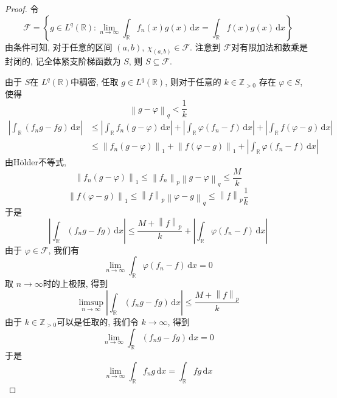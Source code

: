 \documentclass[../main.tex]{subfiles}
\begin{document}
\begin{proof}
 令 \[
    \mathcal{F}= \left\{ g \in L^{q}\left( \mathbb{R}  \right): \lim_{n\to \infty}\int_{\mathbb{R} }f_{n}\left( x \right)g\left( x \right)\,\mathrm{d} x= \int_{\mathbb{R} }f\left( x \right)g\left( x \right)\,\mathrm{d} x      \right\}
    \]
    由条件可知, 对于任意的区间 \(  \left( a,b \right)   \), \(  \chi _{\left( a,b \right) }\in \mathcal{F}  \). 注意到 \(  \mathcal{F}  \)对有限加法和数乘是封闭的, 记全体紧支阶梯函数为 \(  S  \), 则 \(  S\subseteq \mathcal{F}  \).
    
  由于 \(  S  \)在 \(  L^{q}\left( \mathbb{R}  \right)   \)中稠密,  任取 \(  g\in L^{q}\left( \mathbb{R}  \right)   \), 则对于任意的 \(  k\in \mathbb{Z} _{> 0}  \) 存在 \(   \varphi \in S  \), 使得   \[
  \left\| g- \varphi  \right\|_{q}<  \frac{1 }{k } 
  \]\[
\begin{aligned}
  \left| \int_{\mathbb{R} }\left( f_{n}g-fg \right)\,\mathrm{d} x \right|&\le \left| \int_{\mathbb{R} }f_{n}\left( g- \varphi  \right) \,\mathrm{d} x \right|+ \left| \int_{\mathbb{R} }  \varphi \left( f_{n}-f \right)\,\mathrm{d} x \right|+ \left| \int_{\mathbb{R} }f\left(  \varphi -g \right)\,\mathrm{d} x  \right|  \\ 
   &\le \left\| f_{n}\left( g- \varphi  \right)  \right\|_{1}+ \left\| f\left(  \varphi -g \right)  \right\|_{1}+ \left| \int_{\mathbb{R} } \varphi \left( f_{n}-f \right)\,\mathrm{d} x  \right|  
\end{aligned}   
  \]由H\"older不等式, \[
  \left\| f_{n}\left( g- \varphi  \right)  \right\|_{1}\le \left\| f_{n} \right\|_{p}\left\| g- \varphi  \right\|_{q}\le \frac{M }{k } 
  \] \[
  \left\| f\left(  \varphi -g \right)  \right\|_{1}\le \left\| f \right\|_{p}\left\|  \varphi -g \right\|_{q}\le \left\| f \right\|_{p}\frac{1 }{k } 
  \]于是 \[
  \left| \int_{\mathbb{R} }\left( f_{n}g-fg \right)\,\mathrm{d} x  \right|\le \frac{M+ \left\| f \right\|_{p} }{k }+ \left| \int_{\mathbb{R} } \varphi \left( f_{n}-f \right)\,\mathrm{d} x  \right|   
  \]
由于 \(   \varphi \in \mathcal{F}  \), 我们有 \[
\lim_{n\to \infty}\int_{\mathbb{R} } \varphi \left( f_{n}-f \right)\,\mathrm{d} x= 0 
  \]取 \(  n\to \infty  \)时的上极限, 得到 \[
 \limsup_{n\to \infty}\left| \int_{\mathbb{R} }\left( f_{n}g-fg \right)\,\mathrm{d} x  \right|\le \frac{M+ \left\| f \right\|_{p} }{k }  
  \] 由于 \(  k\in \mathbb{Z} _{> 0}  \)可以是任取的, 我们令 \(  k\to \infty  \), 得到 \[
 \lim_{n\to \infty}\int_{\mathbb{R} }\left( f_{n}g-fg \right)\,\mathrm{d} x= 0 
  \]  于是 \[
  \lim_{n\to \infty}\int_{\mathbb{R} }f_{n}g\,\mathrm{d} x=  \int _{\mathbb{R} }fg\,\mathrm{d} x
  \]
\end{proof}
\end{document}
